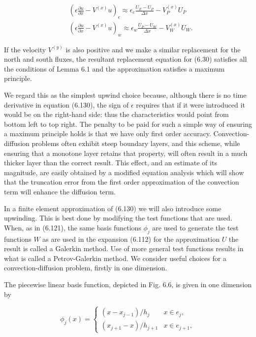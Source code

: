 \documentclass[10pt]{article}
\begin{document}
\[
\begin{aligned}
& \left(\epsilon \frac{\partial u}{\partial x}-V^{(x)} u\right)_{e} \approx \epsilon_{e} \frac{U_{E}-U_{P}}{\Delta x}-V_{P}^{(x)} U_{P} \\
& \left(\epsilon \frac{\partial u}{\partial x}-V^{(x)} u\right)_{w} \approx \epsilon_{w} \frac{U_{P}-U_{W}}{\Delta x}-V_{W}^{(x)} U_{W} .
\end{aligned}
\]

If the velocity \(V^{(y)}\) is also positive and we make a similar replacement for the north and south fluxes, the resultant replacement equation for (6.30) satisfies all the conditions of Lemma 6.1 and the approximation satisfies a maximum principle.

We regard this as the simplest upwind choice because, although there is no time derivative in equation (6.130), the sign of \(\epsilon\) requires that if it were introduced it would be on the right-hand side: thus the characteristics would point from bottom left to top right. The penalty to be paid for such a simple way of ensuring a maximum principle holds is that we have only first order accuracy. Convection-diffusion problems often exhibit steep boundary layers, and this scheme, while ensuring that a monotone layer retains that property, will often result in a much thicker layer than the correct result. This effect, and an estimate of its magnitude, are easily obtained by a modified equation analysis which will show that the truncation error from the first order approximation of the convection term will enhance the diffusion term.

In a finite element approximation of (6.130) we will also introduce some upwinding. This is best done by modifying the test functions that are used. When, as in (6.121), the same basis functions \(\phi_{j}\) are used to generate the test functions \(W\) as are used in the expansion (6.112) for the approximation \(U\) the result is called a Galerkin method. Use of more general test functions results in what is called a Petrov-Galerkin method. We consider useful choices for a convection-diffusion problem, firstly in one dimension.

The piecewise linear basis function, depicted in Fig. 6.6, is given in one dimension by

\[
\phi_{j}(x)= \begin{cases}\left(x-x_{j-1}\right) / h_{j} & x \in e_{j}, \\ \left(x_{j+1}-x\right) / h_{j+1} & x \in e_{j+1},\end{cases}
\]
\end{document}
